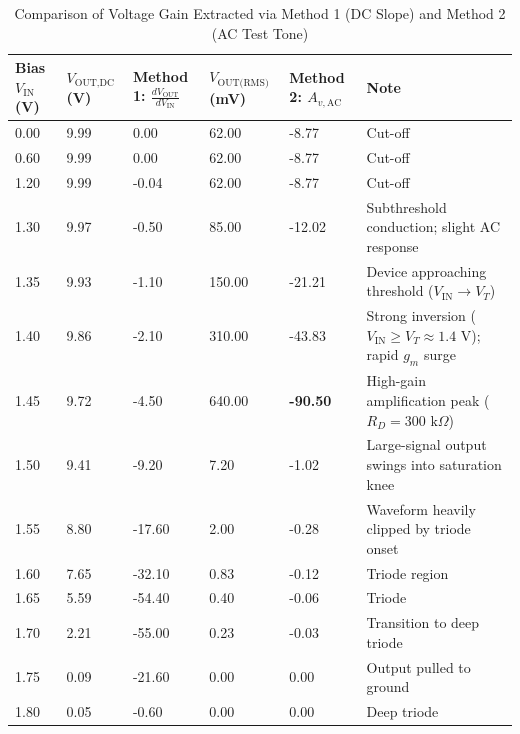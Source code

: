 \documentclass[11pt,a4paper]{article}
\begin{document}
\begin{table}[H]
\centering
\caption{Comparison of Voltage Gain Extracted via Method 1 (DC Slope) and Method 2 (AC Test Tone)}\label{tab:comparison}
\begin{tabular}{p{1.4cm} p{1.6cm} p{2.2cm} p{2.2cm} p{2.2cm} p{5.0cm}}
\toprule
\textbf{Bias $V_{\text{IN}}$ (V)} & \textbf{$V_{\text{OUT,DC}}$ (V)} & \textbf{Method 1: $\frac{dV_{\text{OUT}}}{dV_{\text{IN}}}$} & \textbf{$V_{\text{OUT(RMS)}}$ (mV)} & \textbf{Method 2: $A_{v,\text{AC}}$} & \textbf{Note} \\
\midrule
0.00 & 9.99 & 0.00   & 62.00  & -8.77  & Cut-off\\
0.60 & 9.99 & 0.00   & 62.00  & -8.77  & Cut-off\\
1.20 & 9.99 & -0.04  & 62.00  & -8.77  & Cut-off\\
1.30 & 9.97 & -0.50  & 85.00  & -12.02 & Subthreshold conduction; slight AC response \\
1.35 & 9.93 & -1.10  & 150.00 & -21.21 & Device approaching threshold ($V_{\text{IN}} \to V_T$) \\
1.40 & 9.86 & -2.10  & 310.00 & -43.83 & Strong inversion ($V_{\text{IN}} \ge V_T \approx 1.4\text{ V}$); rapid $g_m$ surge \\
1.45 & 9.72 & -4.50  & 640.00 & \textbf{-90.50} & High-gain amplification peak ($R_D = 300\text{ k}\Omega$) \\
1.50 & 9.41 & -9.20  & 7.20   & -1.02  & Large-signal output swings into saturation knee \\
1.55 & 8.80 & -17.60 & 2.00   & -0.28  & Waveform heavily clipped by triode onset \\
1.60 & 7.65 & -32.10 & 0.83   & -0.12  & Triode region\\
1.65 & 5.59 & -54.40 & 0.40   & -0.06  & Triode \\
1.70 & 2.21 & -55.00 & 0.23   & -0.03  & Transition to deep triode \\
1.75 & 0.09 & -21.60 & 0.00   & 0.00   & Output pulled to ground \\
1.80 & 0.05 & -0.60  & 0.00   & 0.00   & Deep triode\\
\bottomrule
\end{tabular}
\end{table}
\end{document}
